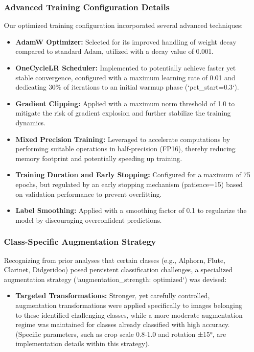 \subsubsection{Advanced Training Configuration Details}
Our optimized training configuration incorporated several advanced techniques:
\begin{itemize}
    \item \textbf{AdamW Optimizer:} Selected for its improved handling of weight decay compared to standard Adam, utilized with a decay value of 0.001.
    \item \textbf{OneCycleLR Scheduler:} Implemented to potentially achieve faster yet stable convergence, configured with a maximum learning rate of 0.01 and dedicating 30\% of iterations to an initial warmup phase (`pct_start=0.3`).
    \item \textbf{Gradient Clipping:} Applied with a maximum norm threshold of 1.0 to mitigate the risk of gradient explosion and further stabilize the training dynamics.
    \item \textbf{Mixed Precision Training:} Leveraged to accelerate computations by performing suitable operations in half-precision (FP16), thereby reducing memory footprint and potentially speeding up training.
    \item \textbf{Training Duration and Early Stopping:} Configured for a maximum of 75 epochs, but regulated by an early stopping mechanism (patience=15) based on validation performance to prevent overfitting.
    \item \textbf{Label Smoothing:} Applied with a smoothing factor of 0.1 to regularize the model by discouraging overconfident predictions.
\end{itemize}

\subsubsection{Class-Specific Augmentation Strategy}
Recognizing from prior analyses that certain classes (e.g., Alphorn, Flute, Clarinet, Didgeridoo) posed persistent classification challenges, a specialized augmentation strategy (`augmentation_strength: optimized`) was devised:
\begin{itemize}
    \item \textbf{Targeted Transformations:} Stronger, yet carefully controlled, augmentation transformations were applied specifically to images belonging to these identified challenging classes, while a more moderate augmentation regime was maintained for classes already classified with high accuracy. (Specific parameters, such as crop scale 0.8-1.0 and rotation ±15°, are implementation details within this strategy).
\end{itemize}
